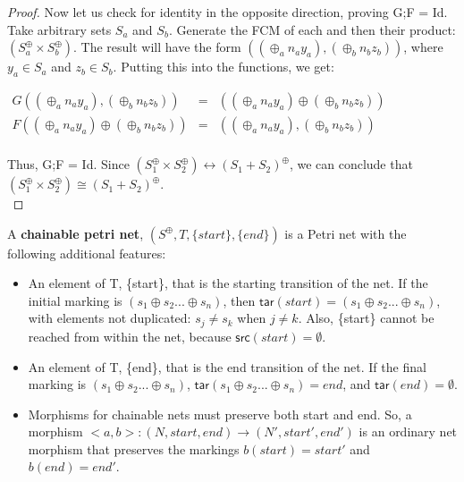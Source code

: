 \begin{lemma}
\begin{proof}
Now let us check for identity in the opposite direction, proving G;F = Id.\\
Take arbitrary sets $S_a$ and $S_b$. Generate the FCM of each and then their product: $(S_a^\oplus \times S_b^\oplus)$. The result will have the form $((\oplus_a n_a y_a), (\oplus_b n_b z_b))$, where $y_a \in S_a$ and $z_b \in S_b$. Putting this into the functions, we get:\\
\begin{center}
  \begin{math}
    \begin{array}{lll}
     G((\oplus_a n_a y_a), (\oplus_b n_b z_b)) & = & ((\oplus_a n_a y_a) \oplus (\oplus_b n_b z_b)) \\
     F((\oplus_a n_a y_a) \oplus (\oplus_b n_b z_b)) & = & ((\oplus_a n_a y_a), (\oplus_b n_b z_b))\\
    \end{array}
  \end{math}
\end{center}
 
Thus, G;F = Id. 
Since $(S_1 ^\oplus \times S_2 ^\oplus) \leftrightarrow (S_1 + S_2)^\oplus$, we can conclude that $(S_1 ^\oplus \times S_2 ^\oplus) \cong (S_1 + S_2)^\oplus$.\\
\end{proof}
%
\end{lemma}
%
\begin{definition}
  \label{Chainable-Petri-Net}
  A \textbf{chainable petri net}, $(S^\oplus, T, \{start\}, \{end\})$ is a Petri net with the following additional features: 
  \begin{itemize}
  \item An element of T, \{start\}, that is the starting transition of the net. If the initial marking is $(s_1 \oplus s_2 ... \oplus s_n)$, then  $\mathsf{tar}(start) = (s_1 \oplus s_2 ... \oplus s_n)$, with elements not duplicated: $s_j \neq s_k$ when $j \neq k$. Also, \{start\} cannot be reached from within the net, because $\mathsf{src}(start) = \emptyset.$  
  \item An element of T, \{end\}, that is the end transition of the net. If the final marking is $(s_1 \oplus s_2 ... \oplus s_n)$, $\mathsf{tar}(s_1 \oplus s_2 ... \oplus s_n) = end$, and $\mathsf{tar}(end) = \emptyset$. 
   \item Morphisms for chainable nets must preserve both start and end. So, a morphism $<a,b>: (N, start, end) \to (N', start', end')$ is an ordinary net morphism that preserves the markings $b(start) = start'$ and $b(end) = end'$. 
 \end{itemize}
\end{definition}
